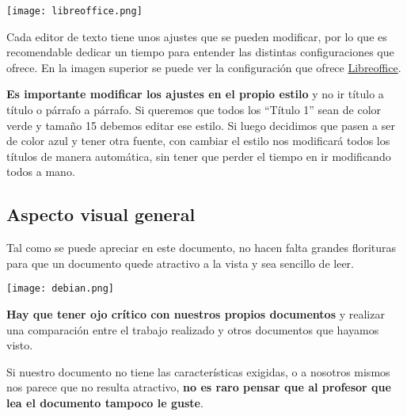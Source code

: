 \begin{center}
    \texttt{[image: libreoffice.png]}
\end{center}

Cada editor de texto tiene unos ajustes que se pueden modificar, por lo que es recomendable dedicar un tiempo para entender las distintas configuraciones que ofrece. En la imagen superior se puede ver la configuración que ofrece \href{https://es.libreoffice.org/}{Libreoffice}.


\textbf{Es importante modificar los ajustes en el propio estilo} y no ir título a título o párrafo a párrafo. Si queremos que todos los “Título 1” sean de color verde y tamaño 15 debemos editar ese estilo. Si luego decidimos que pasen a ser de color azul y tener otra fuente, con cambiar el estilo nos modificará todos los títulos de manera automática, sin tener que perder el tiempo en ir modificando todos a mano.

\vspace{10pt}

\subsection{Aspecto visual general}
Tal como se puede apreciar en este documento, no hacen falta grandes florituras para que un documento quede atractivo a la vista y sea sencillo de leer.
\vspace{10pt}

\begin{minipage}{0.25\linewidth}
    \begin{center}
        \texttt{[image: debian.png]}
    \end{center}
\end{minipage}
\hfill
\begin{minipage}{0.7\linewidth}
    \setlength{\parskip}{1.2em}
    \renewcommand{\baselinestretch}{1.4}
\textbf{Hay que tener ojo crítico con nuestros propios documentos} y realizar una comparación entre el trabajo realizado y otros documentos que hayamos visto.


Si nuestro documento no tiene las características exigidas, o a nosotros mismos nos parece que no resulta atractivo, \textbf{no es raro pensar que al profesor que lea el documento tampoco le guste}.
\end{minipage}

